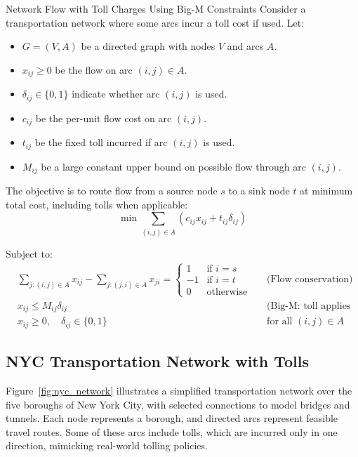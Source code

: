 \begin{example}{Network Flow with Toll Charges Using Big-M Constraints}{}
Consider a transportation network where some arcs incur a toll cost if used. Let:
\begin{itemize}
  \item \( G = (V, A) \) be a directed graph with nodes \(V\) and arcs \(A\).
  \item \( x_{ij} \geq 0 \) be the flow on arc \((i,j) \in A\).
  \item \( \delta_{ij} \in \{0,1\} \) indicate whether arc \((i,j)\) is used.
  \item \( c_{ij} \) be the per-unit flow cost on arc \((i,j)\).
  \item \( t_{ij} \) be the fixed toll incurred if arc \((i,j)\) is used.
  \item \( M_{ij} \) be a large constant upper bound on possible flow through arc \((i,j)\).
\end{itemize}

The objective is to route flow from a source node \(s\) to a sink node \(t\) at minimum total cost, including tolls when applicable:
\[
\min \sum_{(i,j) \in A} \left( c_{ij} x_{ij} + t_{ij} \delta_{ij} \right)
\]

\noindent Subject to:
\begin{align*}
  &\sum_{j: (i,j) \in A} x_{ij} - \sum_{j: (j,i) \in A} x_{ji} =
  \begin{cases}
    1 & \text{if } i = s \\
    -1 & \text{if } i = t \\
    0 & \text{otherwise}
  \end{cases} &&\text{(Flow conservation)} \\
  &x_{ij} \le M_{ij} \delta_{ij} &&\text{(Big-M: toll applies only if arc is used)} \\
  &x_{ij} \ge 0, \quad \delta_{ij} \in \{0,1\} &&\text{for all } (i,j) \in A
\end{align*}

\end{example}

\subsection*{NYC Transportation Network with Tolls}

Figure~\ref{fig:nyc_network} illustrates a simplified transportation network over the five boroughs of New York City, with selected connections to model bridges and tunnels. Each node represents a borough, and directed arcs represent feasible travel routes. Some of these arcs include tolls, which are incurred only in one direction, mimicking real-world tolling policies.

